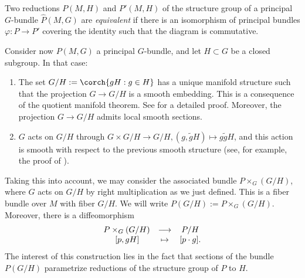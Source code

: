 \noindent
\begin{minipage}{0.75\textwidth}
    Two reductions \(P(M, H)\) and \(P'(M, H)\) of the structure group of a principal \(G\)-bundle \(\hat{P}(M,G)\) are \textit{equivalent} if there is an isomorphism of principal bundles \(\varphi\colon P\to P'\) covering the identity such that the diagram is commutative.
\end{minipage}
\begin{minipage}{0.24\textwidth}
    \begin{center}
    \end{center}
\end{minipage}

Consider now \(P(M,G)\) a principal \(G\)-bundle, and let \(H \subset G\) be a closed subgroup. In that case:
\begin{enumerate}
    \item The set \(G/H:=\corch{gH: g \in H}\) has a unique manifold structure such that the projection \(G \to G/H\) is a smooth embedding. This is a consequence of the quotient manifold theorem. See \parencite[Th. 21.17]{lee_introSM} for a detailed proof. Moreover, the projection \(G \to G/H\) admits local smooth sections.
    \item \(G\) acts on \(G/H\) through \(G \times G/H \to G/H, (g, \tilde{g}H) \mapsto g\tilde{g} H\), and this action is smooth with respect to the previous smooth structure (see, for example, the proof of \parencite[Th. 21.17]{lee_introSM}).  
\end{enumerate}

Taking this into account, we may consider the associated bundle \(P \times _G (G/H)\), where \(G\) acts on \(G/H\) by right multiplication as we just defined. This is a fiber bundle over \(M\) with fiber \(G/H\). We will write \(P(G/H):=P\times_G (G/H)\). Moreover, there is a diffeomorphism
\[
\begin{array}{ccc}
    P \times _G(G/H) & \longrightarrow & P/H \\
   \hspace{1 pt} [p, gH] & \mapsto & [p\cdot g].
\end{array}
\]
The interest of this construction lies in the fact that sections of the bundle \(P(G/H)\) parametrize reductions of the structure group of \(P\) to \(H\).

